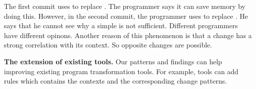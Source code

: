 The first commit uses  to replace . The programmer says it can save memory by doing this. However, in the second commit, the programmer uses  to replace . He says that he cannot see why a simple  is not sufficient. Different programmers have different opinons. Another reason of this phenomenon is that a change has a strong correlation with its context. So opposite changes are possible.

\noindent
\textbf{The extension of existing tools.} Our patterns and findings can help improving existing program transformation tools. For example, tools can add rules which contains the contexts and the corresponding change patterns.
